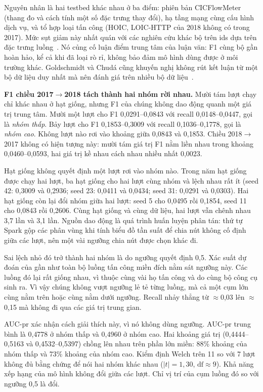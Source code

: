 Nguyên nhân là hai testbed khác nhau ở ba điểm: phiên bản CICFlowMeter (thang đo và cách tính một số đặc trưng thay đổi), hạ tầng mạng cùng cấu hình dịch vụ, và tổ hợp loại tấn công (HOIC, LOIC-HTTP của 2018 không có trong 2017). Mức sụt giảm này nhất quán với các nghiên cứu khác bộ trên \ac{ids} dựa trên đặc trưng luồng~\cite{dhooge2020interdataset,cantone2024crossdataset,sarhan2022explainable}. Nó củng cố luận điểm trung tâm của luận văn: F1 cùng bộ gần hoàn hảo, kể cả khi đã loại rò rỉ, không bảo đảm mô hình dùng được ở môi trường khác. Goldschmidt và Chudá cũng khuyến nghị không rút kết luận từ một bộ dữ liệu duy nhất mà nên đánh giá trên nhiều bộ dữ liệu~\cite{goldschmidt2025datasets}.

\textbf{F1 chiều 2017$\rightarrow$2018 tách thành hai nhóm rời nhau.} Mười tám lượt chạy chỉ khác nhau ở hạt giống, nhưng F1 của chúng không dao động quanh một giá trị trung tâm. Mười một lượt cho F1 0{,}0291--0{,}0843 với recall 0{,}0148--0{,}0447, gọi là \emph{nhóm thấp}. Bảy lượt cho F1 0{,}1853--0{,}3009 với recall 0{,}1036--0{,}1778, gọi là \emph{nhóm cao}. Không lượt nào rơi vào khoảng giữa 0{,}0843 và 0{,}1853. Chiều 2018$\rightarrow$2017 không có hiện tượng này: mười tám giá trị F1 nằm liền nhau trong khoảng 0{,}0460--0{,}0593, hai giá trị kề nhau cách nhau nhiều nhất 0{,}0023.

Hạt giống không quyết định một lượt rơi vào nhóm nào. Trong năm hạt giống được chạy hai lượt, ba hạt giống cho hai lượt cùng nhóm và lệch nhau rất ít (seed 42: 0{,}3009 và 0{,}2936; seed 23: 0{,}0411 và 0{,}0434; seed 31: 0{,}0291 và 0{,}0303). Hai hạt giống còn lại đổi nhóm giữa hai lượt: seed 5 cho 0{,}0495 rồi 0{,}1854, seed 11 cho 0{,}0843 rồi 0{,}2606. Cùng hạt giống và cùng dữ liệu, hai lượt vẫn chênh nhau 3{,}7 lần và 3{,}1 lần. Nguồn dao động là quá trình huấn luyện phân tán: thứ tự Spark gộp các phân vùng khi tính biểu đồ tần suất để chia nút không cố định giữa các lượt, nên một vài ngưỡng chia nút được chọn khác đi.

Sai lệch nhỏ đó trở thành hai nhóm là do ngưỡng quyết định 0{,}5. Xác suất dự đoán của gần như toàn bộ luồng tấn công miền đích nằm sát ngưỡng này. Các luồng đó lại rất giống nhau, vì thuộc cùng vài họ tấn công và do cùng bộ công cụ sinh ra. Vì vậy chúng không vượt ngưỡng lẻ tẻ từng luồng, mà cả một cụm lớn cùng nằm trên hoặc cùng nằm dưới ngưỡng. Recall nhảy thẳng từ $\approx$0{,}03 lên $\approx$0{,}15 mà không đi qua các giá trị trung gian.

AUC-\ac{pr} xác nhận cách giải thích này, vì nó không dùng ngưỡng. AUC-\ac{pr} trung bình là 0{,}4778 ở nhóm thấp và 0{,}4960 ở nhóm cao. Hai khoảng giá trị (0{,}4444--0{,}5163 và 0{,}4532--0{,}5397) chồng lên nhau trên phần lớn miền: 88\% khoảng của nhóm thấp và 73\% khoảng của nhóm cao. Kiểm định Welch trên 11 so với 7 lượt không đủ bằng chứng để nói hai nhóm khác nhau ($|t| = 1{,}30$, $\mathrm{df} \approx 9$). Khả năng xếp hạng của mô hình không đổi giữa các lượt. Chỉ vị trí của cụm luồng đó so với ngưỡng 0{,}5 là đổi.


